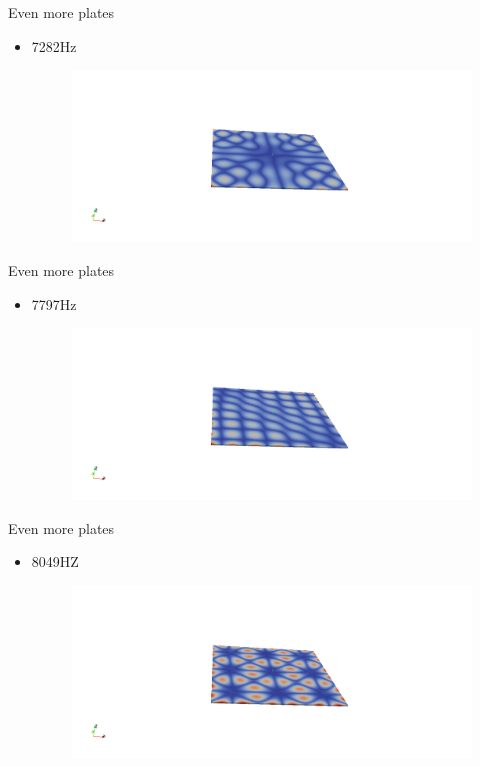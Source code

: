 \documentclass{beamer}[10pt]
\begin{document}
\begin{frame}{Even more plates}
\begin{itemize}
\item{
7282Hz
\begin{figure}
\centering
\includegraphics[scale=0.3, trim= 100mm 0mm 100mm 0mm, clip]{10a.png}
\end{figure}

}
\end{itemize}
\end{frame}

\begin{frame}{Even more plates}
\begin{itemize}
\item{
7797Hz
\begin{figure}
\centering
\includegraphics[scale=0.3, trim= 100mm 0mm 100mm 0mm, clip]{7a.png}
\end{figure}

}
\end{itemize}
\end{frame}


\begin{frame}{Even more plates}
\begin{itemize}
\item{
8049HZ
\begin{figure}
\centering
\includegraphics[scale=0.3, trim= 100mm 0mm 100mm 0mm, clip]{1a.png}
\end{figure}

}
\end{itemize}
\end{frame}
\end{document}
